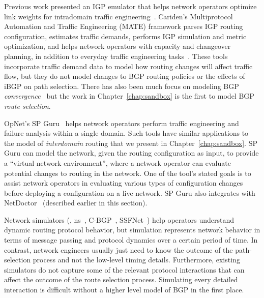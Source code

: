


Previous work presented an IGP emulator that helps network operators
optimize link weights for intradomain traffic
engineering~\cite{Feldmann2000}. 
Cariden's Multiprotocol Automation and Traffic Engineering (MATE)
framework parses IGP routing configuration, estimates traffic demands,
performs IGP simulation and metric optimization, and helps network
operators with capacity and changeover planning, in addition to everyday
traffic engineering tasks~\cite{www-cariden-mate}.
These tools incorporate traffic demand data to model how routing changes
will affect traffic flow, but they do not model changes to BGP routing
policies or the effects of iBGP on path selection.  There has also been
much focus on modeling BGP {\em
convergence}~\cite{Gao2001a,Griffin2002c,labovitz:ton01,Sobrinho2003}
but the work in Chapter~\ref{chap:sandbox} is the first to model BGP
{\em route selection\/}.

OpNet's SP Guru~\cite{www-opnet-spguru} helps network operators perform
traffic engineering and failure analysis within a single domain.  Such
tools have similar applications to the model of {\em interdomain}
routing that we present in Chapter~\ref{chap:sandbox}.  SP Guru can
model the network, given the routing configuration as input, to provide
a ``virtual network environment'', where a network operator can evaluate
potential changes to routing in the network.  One of the tool's stated
goals is to assist network operators in evaluating various types of
configuration changes before deploying a configuration on a live
network.  SP Guru also integrates with
NetDoctor~\cite{www-opnet-netdoctor}  (described earlier in this section).

Network simulators (\eg, ns~\cite{www-ns-bgp}, C-BGP~\cite{www-cbgp},
SSFNet~\cite{www-ssfnet}) 
help operators understand dynamic routing protocol behavior, but
simulation represents network behavior in terms of message passing and
protocol dynamics over a certain period of time.  In contrast, network
engineers usually just need to know the outcome of the path-selection
process and not the low-level timing details.  Furthermore, existing
simulators do not capture some of the relevant protocol interactions
that can affect the outcome of the route selection process.  Simulating every
detailed interaction is difficult without a higher level model of BGP
in the first place.


